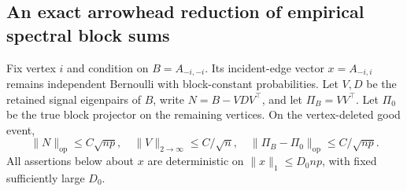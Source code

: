\documentclass[11pt]{article}
\theoremstyle{definition}
\theoremstyle{remark}
\numberwithin{equation}{section}
\begin{document}
\subsection{An exact arrowhead reduction of empirical spectral block sums}
Fix vertex $i$ and condition on $B=A_{-i,-i}$. Its incident-edge vector $x=A_{-i,i}$ remains independent Bernoulli with block-constant probabilities. Let $V,D$ be the retained signal eigenpairs of $B$, write $N=B-VDV^\top$, and let $\Pi_B=VV^\top$. Let $\Pi_0$ be the true block projector on the remaining vertices. On the vertex-deleted good event,
\[
 \|N\|_{\mathrm{op}}\le C\sqrt{np},\quad
 \|V\|_{2\to\infty}\le C/\sqrt n,\quad
 \|\Pi_B-\Pi_0\|_{\mathrm{op}}\le C/\sqrt{np}.
\]
All assertions below about $x$ are deterministic on $\|x\|_1\le D_0np$, with fixed sufficiently large $D_0$.
\end{document}
